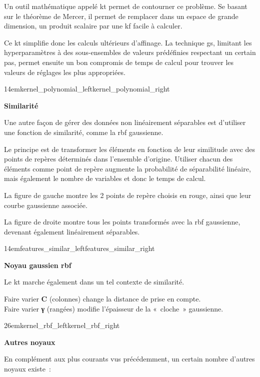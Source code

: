 Un outil mathématique appelé \gls{kt} permet de contourner ce problème.
Se basant sur le théorème de Mercer, il permet de remplacer dans un espace
de grande dimension, un produit scalaire par une \gls{kf} facile à calculer.

Ce \gls{kt} simplifie donc les calculs ultérieurs d’affinage.
La technique \gls{gs}, limitant les hyperparamètres à des sous-ensembles
de valeurs prédéfinies respectant un certain pas, permet ensuite un bon
compromis de temps de calcul pour trouver les valeurs de réglages
les plus appropriées.

{14em}{kernel_polynomial_left}{kernel_polynomial_right}

\textbf{Similarité}

Une autre façon de gérer des données non linéairement séparables
est d’utiliser une fonction de similarité, comme la \gls{rbf} gaussienne.

Le principe est de transformer les éléments en fonction de leur similitude
avec des points de repères déterminés dans l’ensemble d’origine.
Utiliser chacun des éléments comme point de repère augmente la probabilité
de séparabilité linéaire, mais également le nombre de variables et donc
le temps de calcul.

La figure de gauche montre les 2 points de repère choisis en rouge,
ainsi que leur courbe gaussienne associée.

La figure de droite montre tous les points transformés avec la \gls{rbf}
gaussienne, devenant également linéairement séparables.

{14em}{features_similar_left}{features_similar_right}

\textbf{Noyau gaussien \gls{rbf}}

Le \gls{kt} marche également dans un tel contexte de similarité.

Faire varier \textbf{C} (colonnes) change la distance de prise en compte.\\
Faire varier \textbf{γ} (rangées) modifie l’épaisseur de la « cloche » gaussienne.

{26em}{kernel_rbf_left}{kernel_rbf_right}

\pagebreak

\textbf{Autres noyaux}

En complément aux plus courants vus précédemment, un certain nombre
d’autres noyaux existe :

